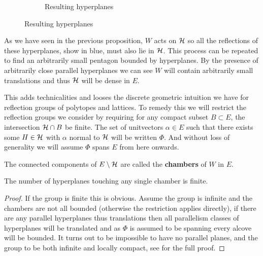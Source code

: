 \documentclass[../main.tex]{subfiles}
\begin{document}
\begin{example}
\begin{figure}[H]
\begin{subfigure}{0.45\textwidth}
        \caption{Resulting hyperplanes}
      \end{subfigure}
    \end{figure}
    As we have seen in the previous proposition, $W$ acts on $\mathcal{H}$ so all the reflections of these hyperplanes, show in blue, must also lie in $\mathcal{H}$. This process can be repeated to find an arbitrarily small pentagon bounded by hyperplanes. By the presence of arbitrarily close parallel hyperplanes we can see $W$ will contain arbitrarily small translations and thus $\mathcal{H}$ will be dense in $E$.
\end{example}

This adds technicalities and looses the discrete geometric intuition we have for reflection groups of polytopes and lattices. To remedy this we will restrict the reflection groups we consider by requiring for any compact subset $B\subset E$, the intersection $\mathcal{H}\cap B$ be finite. The set of unitvectors $\alpha \in E$ such that there exists some $H\in \mathcal{H}$ with $\alpha$ normal to $\mathcal{H}$ will be written $\Phi$. And without loss of generality we will assume $\Phi$ spans $E$ from here onwards.

\begin{definition}
    The connected components of $E\setminus \mathcal{H}$ are called the \textbf{chambers} of $W$ in $E$.
\end{definition}

\begin{proposition}
    The number of hyperplanes touching any single chamber is finite.
    \begin{proof}
        If the group is finite this is obvious. Assume the group is infinite and the chambers are not all bounded (otherwise the restriction applies directly), if there are any parallel hyperplanes thus translations then all parallelism classes of hyperplanes will be translated and as $\Phi$ is assumed to be spanning every alcove will be bounded. It turns out to be impossible to have no parallel planes, and the group to be both infinite and locally compact, see \cite{Humphreys1990} for the full proof.
    \end{proof}
\end{proposition}
\end{document}
